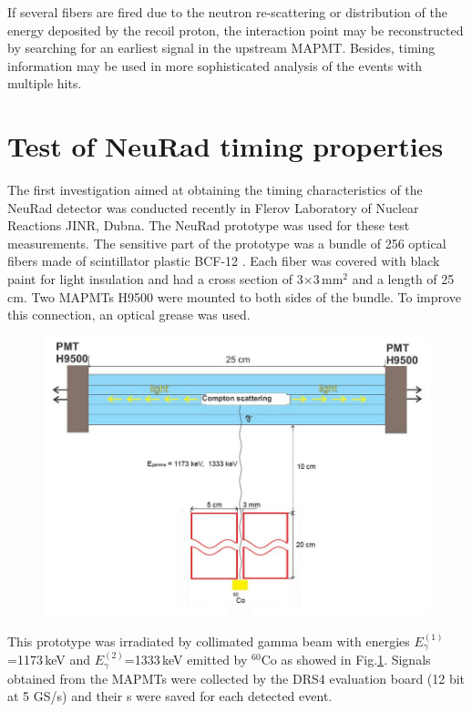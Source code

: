 \documentclass{webofc}
\begin{document}
If several  fibers are fired due to the neutron re-scattering or distribution of the energy deposited by the recoil proton, the interaction point may be reconstructed by searching for an earliest signal in the upstream MAPMT. Besides, timing information may be used in more sophisticated analysis of the events with multiple hits.

\section{Test of NeuRad timing properties}

The first investigation aimed at obtaining the timing characteristics of the NeuRad detector was conducted recently in Flerov Laboratory of Nuclear Reactions JINR, Dubna. The NeuRad prototype was used for these test measurements. The sensitive part of the prototype was a bundle of 256 optical fibers made of scintillator plastic BCF-12 \cite{crystals}. 
Each fiber was covered with black paint for light insulation and had a cross section of 3$\times$3\,mm$^2$ and a length of 25\,cm. Two MAPMTs H9500 \cite{hm} were mounted to both sides of the bundle. To improve this connection, an optical grease was used.

\begin{figure}[h]
	\centering
	\includegraphics[width=0.7\linewidth]{NeuRadexperiment.png}
	\label{ris:neuradexp}
\end{figure}

This prototype was irradiated by collimated gamma beam with energies $E^{(1)}_{\gamma}$=1173\,keV and $E^{(2)}_{\gamma}$=1333\,keV emitted by $^{60}$Co as showed in Fig.\ref{ris:neuradexp}. Signals obtained from the MAPMTs were collected by the DRS4 evaluation board (12 bit at 5 GS/s) and their s were saved for each detected event.
\end{document}
